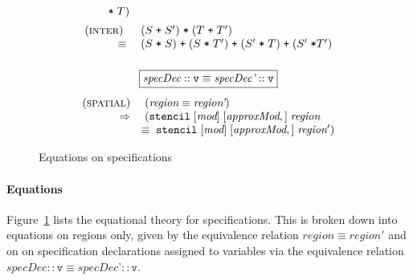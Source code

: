 \documentclass[9pt]{sigplanconf}
\theoremstyle{definition}
\begin{document}
\begin{figure}
\begin{align*}
\begin{array}{c}
\begin{array}{rll}
                       \; \texttt{*} \; T) \\[0.5em] 
(\textsc{inter}) \;\; & (S \; \texttt{+} \; S') \; \texttt{*} \;
                              (T \; \texttt{+} \; T') \\
 \equiv \; & (S \;  \texttt{*} \; S) 
 \; \texttt{+} \; (S \; \texttt{*} \; T') 
 \; \texttt{+} \; (S' \; \texttt{*} \; T)
 \; \texttt{+} \; (S' \; \texttt{*} T')  \\[0.5em] 
\end{array} \\ \\
%
\framebox{${\textit{specDec} :: \texttt{v}} \equiv 
{\textit{specDec'} :: \texttt{v}}$} \\[1em]
\begin{array}{rl}
(\textsc{spatial}) \; &
(\textit{region} \equiv \textit{region'}) \\
\Rightarrow \; & (\texttt{stencil} \; [\textit{mod}] \; [\textit{approxMod},] \;
\textit{region} \\
& \!\!\equiv \; \texttt{stencil} \; [\textit{mod}] \;
            [\textit{approxMod},] \;
\textit{region}') \\
\end{array}
\end{array}
\end{align*}
\caption{Equations on specifications}
\label{fig:equations}
\end{figure}


\paragraph{Equations}
Figure~\ref{fig:equations} lists the equational theory for
specifications. This is broken down into equations on regions only,
given by the equivalence relation $\textit{region} \equiv \textit{region}'$ and on
on specification declarations assigned to variables via the equivalence relation
$\textit{specDec} :: \texttt{v} \equiv
\textit{specDec'} :: \texttt{v}$.
\end{document}

